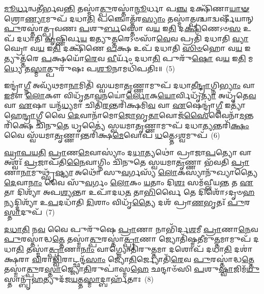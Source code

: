 \-\ul{𑌮𑍂}\-\-\ul{𑌰𑍍𑌧}\-𑌨𑍍𑌵𑌤𑍀॑𑌰𑍍𑌭𑌵\-\ul{𑌨𑍍𑌤𑌿} 𑌤𑌸𑍍𑌮𑌾॑\-\ul{𑌤𑍍𑌪𑍁}\-𑌰𑌸𑍍𑌤𑌾॑\-\ul{𑌨𑍍𑌮𑍂}\-𑌰𑍍𑌧𑌾 𑌪\-\ul{𑌞𑍍𑌚} 𑌦𑌕𑍍𑌷𑌿᳴𑌣𑌾\-\ul{𑌯𑌾}\-\-\ul{𑍟} 𑌶𑍍𑌰𑍋\-\ul{𑌣𑍍𑌯𑌾}\-𑌮𑍁𑌪᳴ 𑌦𑌧𑌾\-\ul{𑌤𑌿} 𑌪𑌞𑍍𑌚𑍋𑌤𑍍𑌤᳴𑌰\-\ul{𑌸𑍍𑌯𑌾𑌂} 𑌤𑌸𑍍𑌮𑌾॑\-\ul{𑌤𑍍𑌪}\-𑌶𑍍𑌚𑌾𑌦𑍍𑌵𑌰𑍍\mbox{}𑌷𑍀᳴𑌯𑌾𑌨𑍍 \ul{𑌪𑍁}\-𑌰𑌸𑍍𑌤𑌾॑𑌤𑍍𑌪𑍍𑌰𑌵𑌣𑌃 \ul{𑌪}\-𑌶𑍁\-\ul{𑌰𑍍𑌬}\-𑌸𑍍𑌤𑍋 𑌵\-\ul{𑌯} 𑌇\-\ul{𑌤𑌿} 𑌦\-\ul{𑌕𑍍𑌷𑌿}\-𑌣𑍇\-𑌽𑍞\-\ul{𑌸} 𑌉𑌪᳴ 𑌦𑌧𑌾𑌤𑌿 \ul{𑌵𑍃}\-𑌷𑍍𑌣𑌿𑌰𑍍𑌵\-\ul{𑌯} 𑌇𑌤𑍍𑌯𑍁\-\ul{𑌤𑍍𑌤}\-𑌰𑍇\-𑌽𑍞𑌸𑌾᳴\-\ul{𑌵𑍇}\-𑌵 𑌪𑍍𑌰𑌤𑌿᳴ 𑌦𑌧𑌾𑌤𑌿 \ul{𑌵𑍍𑌯𑌾}\-𑌘𑍍𑌰𑍋 𑌵\-\ul{𑌯} 𑌇\-\ul{𑌤𑌿} 𑌦𑌕𑍍𑌷𑌿᳴𑌣𑍇 \ul{𑌪}\-𑌕𑍍𑌷 𑌉𑌪᳴ 𑌦𑌧𑌾𑌤𑌿 \ul{𑌸𑌿}\-\-\ul{𑍞}\-𑌹𑍋 𑌵\-\ul{𑌯} 𑌇𑌤𑍍𑌯𑍁𑌤𑍍𑌤᳴𑌰𑍇 \ul{𑌪}\-𑌕𑍍𑌷𑌯𑍋᳴\-\ul{𑌰𑍇}\-𑌵 \ul{𑌵𑍀}\-𑌰𑍍𑌯𑌂᳴ 𑌦𑌧𑌾\-\ul{𑌤𑌿} 𑌪𑍁𑌰𑍁᳴\-\ul{𑌷𑍋} 𑌵\-\ul{𑌯} 𑌇\-\ul{𑌤𑌿} 𑌮\-\ul{𑌧𑍍𑌯𑍇} 𑌤\-\ul{𑌸𑍍𑌮𑌾}\-𑌤𑍍𑌪𑍁𑌰𑍁᳴𑌷𑌃 𑌪\-\ul{𑌶𑍂}\-𑌨𑌾𑌮𑌧𑌿᳴𑌪𑌤𑌿𑌃॥~(5)

{\anuvakamend[{𑌕𑍢𑌪𑍍𑌤𑍍𑌯𑌾᳴ 𑌉\-\ul{𑌪}\-𑌧𑌾𑌯᳴ 𑌪𑍍𑌰𑌾\-\ul{𑌣}\-𑌭𑍃\-\ul{𑌤𑌃} 𑌸𑌮᳴𑌨𑌸𑌃 \ul{𑌕𑍃}\-𑌷𑍍𑌣𑍇 𑌪𑍁𑌰𑍁᳴\-\ul{𑌷𑍋} 𑌵\-\ul{𑌯} 𑌇\-\ul{𑌤𑌿} 𑌪𑌞𑍍𑌚᳴ 𑌚}]}%

𑌇𑌨𑍍𑌦𑍍𑌰𑌾॑\-\ul{𑌗𑍍𑌨𑍀} 𑌅𑌵𑍍𑌯᳴𑌥𑌮𑌾\-\ul{𑌨𑌾}\-𑌮𑌿𑌤𑌿᳴ 𑌸𑍍𑌵𑌯𑌮𑌾\-\ul{𑌤𑍃}\-𑌣𑍍𑌣𑌾𑌮𑍁𑌪᳴ 𑌦𑌧𑌾𑌤𑍀\-\ul{𑌨𑍍𑌦𑍍𑌰𑌾}\-𑌗𑍍𑌨𑌿\-\ul{𑌭𑍍𑌯𑌾𑌂} 𑌵𑌾 \ul{𑌇}\-𑌮𑍗 \ul{𑌲𑍋}\-𑌕𑍗 𑌵𑌿𑌧𑍃᳴𑌤𑌾\-\ul{𑌵}\-𑌨𑌯𑍋॑\-\ul{𑌰𑍍𑌲𑍋}\-𑌕\-\ul{𑌯𑍋}\-𑌰𑍍𑌵𑌿𑌧𑍃᳴\-\ul{𑌤𑍍𑌯𑌾} 𑌅𑌧𑍃᳴𑌤𑍇\-\ul{𑌵} 𑌵𑌾 \ul{𑌏}\-𑌷𑌾 𑌯𑌨𑍍𑌮᳴\-\ul{𑌧𑍍𑌯}\-𑌮𑌾 𑌚𑌿𑌤𑌿᳴\-\ul{𑌰}\-𑌨𑍍𑌤𑌰𑌿᳴𑌕𑍍𑌷𑌮𑌿\-\ul{𑌵} 𑌵𑌾 \ul{𑌏}\-𑌷𑍇𑌨𑍍𑌦𑍍𑌰𑌾॑\-\ul{𑌗𑍍𑌨𑍀} 𑌇𑌤𑍍𑌯𑌾᳴𑌹𑍇\-\ul{𑌨𑍍𑌦𑍍𑌰𑌾}\-𑌗𑍍𑌨𑍀 𑌵𑍈 \ul{𑌦𑍇}\-𑌵𑌾𑌨𑌾᳴𑌮𑍋\-\ul{𑌜𑍋}\-𑌭𑍃\-\ul{𑌤𑌾}\-𑌵𑍋𑌜᳴\-\ul{𑌸𑍈}\-𑌵𑍈𑌨𑌾᳴\-\-\ul{𑌮}\-𑌨𑍍𑌤𑌰𑌿᳴𑌕𑍍𑌷𑍇 𑌚𑌿𑌨𑍁\-\ul{𑌤𑍇} 𑌧𑍃𑌤𑍍𑌯𑍈॑ 𑌸𑍍𑌵𑌯𑌮𑌾\-\ul{𑌤𑍃}\-𑌣𑍍𑌣𑌾𑌮𑍁𑌪᳴ 𑌦𑌧𑌾\-\ul{𑌤𑍍𑌯}\-𑌨𑍍𑌤𑌰𑌿᳴\-\ul{𑌕𑍍𑌷𑌂} 𑌵𑍈 𑌸𑍍𑌵᳴𑌯𑌮𑌾\-\ul{𑌤𑍃}\-𑌣𑍍𑌣𑌾𑌨𑍍𑌤𑌰𑌿᳴𑌕𑍍𑌷\-\ul{𑌮𑍇}\-𑌵𑍋𑌪᳴ \ul{𑌧}\-𑌤𑍍𑌤𑍇\-𑌽\-\ul{𑌶𑍍𑌵}\-𑌮𑍁𑌪᳴~(6)

\-\ul{𑌘𑍍𑌰𑌾}\-\-\ul{𑌪}\-\-\ul{𑌯}\-\-\ul{𑌤𑌿} \ul{𑌪𑍍𑌰𑌾}\-𑌣\-\ul{𑌮𑍇}\-𑌵𑌾𑌸𑍍𑌯𑌾𑌂॑ 𑌦\-\ul{𑌧𑌾}\-𑌤𑍍𑌯𑌥𑍋॑ 𑌪𑍍𑌰𑌾𑌜𑌾\-\ul{𑌪}\-𑌤𑍍𑌯𑍋 𑌵𑌾 𑌅𑌶𑍍𑌵𑌃᳴ \ul{𑌪𑍍𑌰}\-𑌜𑌾𑌪᳴𑌤𑌿\-\ul{𑌨𑍈}\-𑌵𑌾𑌗𑍍𑌨𑌿𑌂 𑌚𑌿᳴𑌨𑍁𑌤𑍇 𑌸𑍍𑌵𑌯𑌮𑌾\-\ul{𑌤𑍃}\-𑌣𑍍𑌣𑌾 𑌭᳴𑌵𑌤𑌿 \ul{𑌪𑍍𑌰𑌾}\-𑌣𑌾\-\ul{𑌨𑌾}\-𑌮𑍁𑌥𑍍𑌸𑍃᳴\-\ul{𑌷𑍍𑌟𑍍𑌯𑌾} 𑌅𑌥𑍋᳴ 𑌸𑍁\-\ul{𑌵}\-𑌰𑍍𑌗𑌸𑍍𑌯᳴ \ul{𑌲𑍋}\-𑌕𑌸𑍍𑌯𑌾𑌨𑍁᳴𑌖𑍍𑌯𑌾𑌤𑍍𑌯𑍈 \ul{𑌦𑍇}\-𑌵𑌾\-\ul{𑌨𑌾𑌂} 𑌵𑍈 𑌸𑍁᳴\-\ul{𑌵}\-𑌰𑍍𑌗𑌂 \ul{𑌲𑍋}\-𑌕𑌂 \ul{𑌯}\-𑌤𑌾𑌂 𑌦𑌿\-\ul{𑌶𑌃} 𑌸𑌮᳴𑌵𑍍𑌲𑍀𑌯\-\ul{𑌨𑍍𑌤} 𑌤 \ul{𑌏}\-𑌤𑌾 𑌦𑌿𑌶𑍍𑌯𑌾᳴ 𑌅𑌪\-\ul{𑌶𑍍𑌯}\-𑌨𑍍𑌤𑌾 𑌉𑌪𑌾᳴𑌦𑌧\-\ul{𑌤} 𑌤𑌾\-\ul{𑌭𑌿}\-𑌰𑍍𑌵𑍈 𑌤𑍇 𑌦𑌿𑌶𑍋᳴\-𑌽𑌦𑍃𑍞\-\ul{𑌹}\-\-\ul{𑌨𑍍}\-𑌯𑌦𑍍𑌦𑌿𑌶𑍍𑌯𑌾᳴ 𑌉\-\ul{𑌪}\-𑌦𑌧𑌾᳴𑌤𑌿 \ul{𑌦𑌿}\-𑌶𑌾𑌂 𑌵𑌿𑌧𑍃᳴\-\ul{𑌤𑍍𑌯𑍈} 𑌦𑌶᳴ 𑌪𑍍𑌰𑌾\-\ul{𑌣}\-𑌭𑍃𑌤𑌃᳴ \ul{𑌪𑍁}\-𑌰\-\ul{𑌸𑍍𑌤𑌾}\-𑌦𑍁𑌪᳴~(7)

\-\ul{𑌦}\-\-\ul{𑌧𑌾}\-\-\ul{𑌤𑌿} 𑌨\-\ul{𑌵} 𑌵𑍈 𑌪𑍁𑌰𑍁᳴𑌷𑍇 \ul{𑌪𑍍𑌰𑌾}\-𑌣𑌾 𑌨𑌾𑌭𑌿᳴𑌰𑍍𑌦\-\ul{𑌶}\-𑌮𑍀 \ul{𑌪𑍍𑌰𑌾}\-𑌣𑌾\-\ul{𑌨𑍇}\-𑌵 \ul{𑌪𑍁}\-𑌰𑌸𑍍𑌤𑌾॑𑌦𑍍𑌧\-\ul{𑌤𑍍𑌤𑍇} 𑌤𑌸𑍍𑌮𑌾॑\-\ul{𑌤𑍍𑌪𑍁}\-𑌰𑌸𑍍𑌤𑌾॑\-\ul{𑌤𑍍𑌪𑍍𑌰𑌾}\-𑌣𑌾 𑌜𑍍𑌯𑍋𑌤𑌿᳴𑌷𑍍𑌮𑌤𑍀𑌮𑍁\-\ul{𑌤𑍍𑌤}\-𑌮𑌾𑌮𑍁𑌪᳴ 𑌦𑌧𑌾\-\ul{𑌤𑌿} 𑌤𑌸𑍍𑌮𑌾॑\-\ul{𑌤𑍍𑌪𑍍𑌰𑌾}\-𑌣𑌾\-\ul{𑌨𑌾𑌂} 𑌵𑌾𑌗𑍍𑌜𑍍𑌯𑍋𑌤𑌿᳴𑌰𑍁\-\ul{𑌤𑍍𑌤}\-𑌮𑌾 𑌦𑌶𑍋𑌪᳴ 𑌦𑌧𑌾\-\ul{𑌤𑌿} 𑌦𑌶𑌾॑𑌕𑍍𑌷𑌰𑌾 \ul{𑌵𑌿}\-𑌰𑌾\-\ul{𑌡𑍍𑌵𑌿}\-𑌰𑌾𑌟𑍍𑌛𑌨𑍍𑌦᳴\-\ul{𑌸𑌾𑌂} 𑌜𑍍𑌯𑍋\-\ul{𑌤𑌿}\-𑌰𑍍𑌜𑍍𑌯𑍋𑌤𑌿᳴\-\ul{𑌰𑍇}\-𑌵 \ul{𑌪𑍁}\-𑌰𑌸𑍍𑌤𑌾॑𑌦𑍍𑌧\-\ul{𑌤𑍍𑌤𑍇} 𑌤𑌸𑍍𑌮𑌾॑\-\ul{𑌤𑍍𑌪𑍁}\-𑌰\-\ul{𑌸𑍍𑌤𑌾}\-𑌜𑍍𑌜𑍍𑌯𑍋\-\ul{𑌤𑌿}\-𑌰𑍁𑌪𑌾॑𑌸𑍍𑌮\-\ul{𑌹𑍇} 𑌛𑌨𑍍𑌦𑌾𑍞᳴𑌸𑌿 \ul{𑌪}\-𑌶𑍁\-\ul{𑌷𑍍𑌵𑌾}\-𑌜𑌿𑌮᳴\-\ul{𑌯𑍁}\-𑌸𑍍𑌤𑌾𑌨𑍍𑌬𑍃᳴\-\ul{𑌹}\-𑌤𑍍𑌯𑍁𑌦᳴𑌜\-\ul{𑌯}\-𑌤𑍍𑌤\-\ul{𑌸𑍍𑌮𑌾}\-𑌦𑍍𑌬𑌾𑌰𑍍\mbox{}𑌹᳴𑌤𑌾𑌃~(8)

